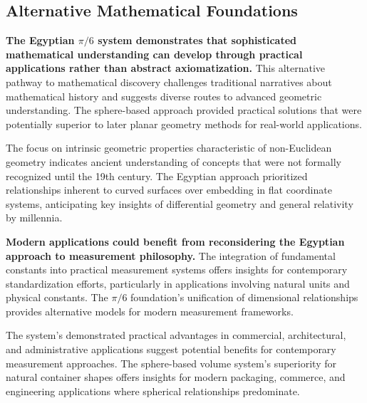 \documentclass[11pt]{article}
\begin{document}
\subsection{Alternative Mathematical Foundations}

\textbf{The Egyptian $\pi/6$ system demonstrates that sophisticated mathematical understanding can develop through practical applications rather than abstract axiomatization.} This alternative pathway to mathematical discovery challenges traditional narratives about mathematical history and suggests diverse routes to advanced geometric understanding. The sphere-based approach provided practical solutions that were potentially superior to later planar geometry methods for real-world applications.

The focus on intrinsic geometric properties characteristic of non-Euclidean geometry indicates ancient understanding of concepts that were not formally recognized until the 19th century. The Egyptian approach prioritized relationships inherent to curved surfaces over embedding in flat coordinate systems, anticipating key insights of differential geometry and general relativity by millennia.

\textbf{Modern applications could benefit from reconsidering the Egyptian approach to measurement philosophy.} The integration of fundamental constants into practical measurement systems offers insights for contemporary standardization efforts, particularly in applications involving natural units and physical constants. The $\pi/6$ foundation's unification of dimensional relationships provides alternative models for modern measurement frameworks.

The system's demonstrated practical advantages in commercial, architectural, and administrative applications suggest potential benefits for contemporary measurement approaches. The sphere-based volume system's superiority for natural container shapes offers insights for modern packaging, commerce, and engineering applications where spherical relationships predominate.
\end{document}
